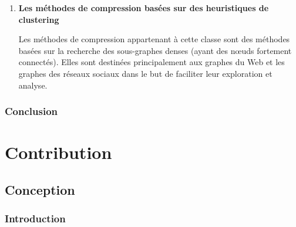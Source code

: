 \documentclass[a4paper,oneside,12pt]{report}
\theoremstyle{definition}
\begin{document}
\begin{enumerate}[label=\alph*.]
\begin{enumerate}[label*=\arabic*.]
								
								
								
							
								
							\item \textbf{Les méthodes de compression basées sur des heuristiques de clustering} 				
							
							Les méthodes de compression appartenant à cette classe sont des méthodes basées sur la recherche des sous-graphes denses (ayant des nœuds fortement connectés). Elles sont destinées principalement aux graphes du Web et les graphes des réseaux sociaux dans le but de faciliter leur exploration et analyse.
								
								
										
						
						\end{enumerate}	
					
					\end{enumerate}
						
												
								
		\section{Conclusion}
	


	
	
	


	
	


\part{Contribution}

%

\chapter{Conception}
	\section{Introduction}
	
\end{document}
